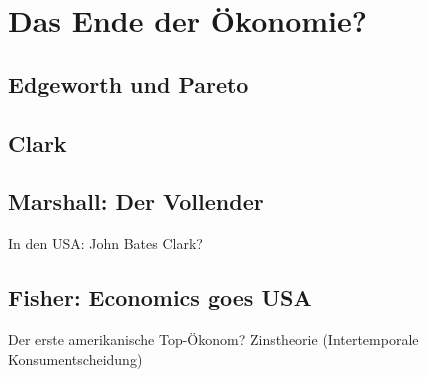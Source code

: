 %
%
%

\chapter{Das Ende der Ökonomie?}
\label{Neoklassik}

\section{Edgeworth und Pareto}

\section{Clark}

\section{Marshall: Der Vollender}
In den USA: John Bates Clark?


\section{Fisher: Economics goes USA}
Der erste amerikanische Top-Ökonom?
Zinstheorie (Intertemporale Konsumentscheidung)